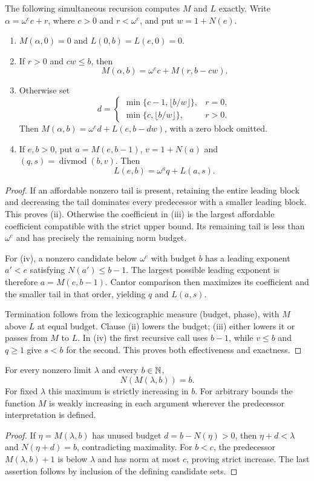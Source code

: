 \begin{theorem}\label{f:thm:maximum-predecessor}
The following simultaneous recursion computes $M$ and $L$ exactly.
Write $\alpha=\omega^e c+r$, where $c>0$ and $r<\omega^e$, and
put $w=1+N(e)$.
\begin{enumerate}[label=(\roman*)]
\item $M(\alpha,0)=0$ and $L(0,b)=L(e,0)=0$.
\item If $r>0$ and $cw\le b$, then
\[
 M(\alpha,b)=\omega^e c+M(r,b-cw).
\]
\item Otherwise set
\[
 d=\begin{cases}
 \min\{c-1,\lfloor b/w\rfloor\},&r=0,\\
 \min\{c,\lfloor b/w\rfloor\},&r>0.
 \end{cases}
\]
Then $M(\alpha,b)=\omega^e d+L(e,b-dw)$, with a zero block
omitted.
\item If $e,b>0$, put $a=M(e,b-1)$, $v=1+N(a)$ and
$(q,s)=\operatorname{divmod}(b,v)$.  Then
\[
 L(e,b)=\omega^a q+L(a,s).
\]
\end{enumerate}
\end{theorem}
\begin{proof}
If an affordable nonzero tail is present, retaining the entire leading
block and decreasing the tail dominates every predecessor with a smaller
leading block.  This proves (ii).  Otherwise the coefficient in (iii)
is the largest affordable coefficient compatible with the strict upper
bound.  Its remaining tail is less than $\omega^e$ and has precisely
the remaining norm budget.

For (iv), a nonzero candidate below $\omega^e$ with budget $b$ has
a leading exponent $a'<e$ satisfying $N(a')\le b-1$.
The largest possible leading exponent is therefore $a=M(e,b-1)$.
Cantor comparison then maximizes its coefficient and the smaller tail
in that order, yielding $q$ and $L(a,s)$.

Termination follows from the lexicographic measure (budget, phase),
with $M$ above $L$ at equal budget.  Clause (ii) lowers the budget;
(iii) either lowers it or passes from $M$ to $L$.  In (iv) the first
recursive call uses $b-1$, while $v\le b$ and $q\ge1$ give $s<b$
for the second.  This proves both effectiveness and exactness.
\end{proof}

\begin{lemma}\label{f:lem:limit-saturation}
For every nonzero limit $\lambda$ and every $b\in\mathbb N$,
\[
 N(M(\lambda,b))=b.
\]
For fixed $\lambda$ this maximum is strictly increasing in $b$.
For arbitrary bounds the function $M$ is weakly increasing in each
argument wherever the predecessor interpretation is defined.
\end{lemma}
\begin{proof}
If $\eta=M(\lambda,b)$ has unused budget $d=b-N(\eta)>0$,
then $\eta+d<\lambda$ and $N(\eta+d)=b$, contradicting
maximality.  For $b<c$, the predecessor $M(\lambda,b)+1$ is
below $\lambda$ and has norm at most $c$, proving strict increase.
The last assertion follows by inclusion of the defining candidate sets.
\end{proof}

